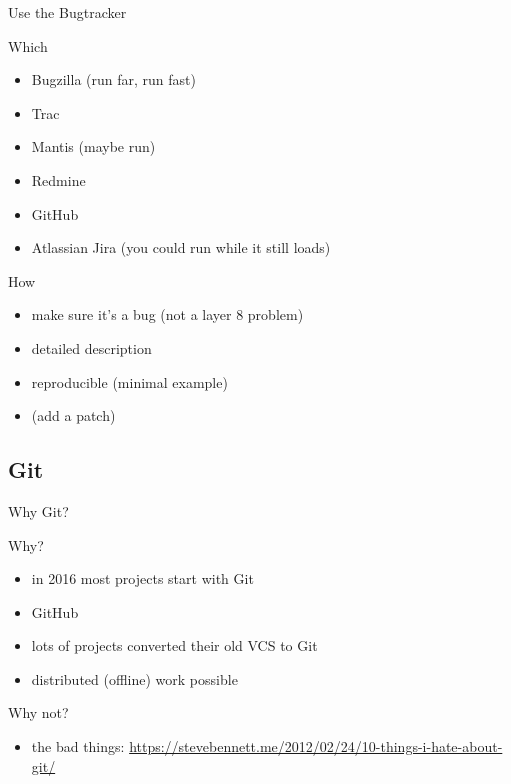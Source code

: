 \documentclass{beamer}
\begin{document}
\begin{frame}{Use the Bugtracker}
    \begin{block}{Which}
        \begin{itemize}
            \item Bugzilla (run far, run fast)
            \item Trac
            \item Mantis (maybe run)
            \item Redmine
            \item GitHub
            \item Atlassian Jira (you could run while it still loads)
        \end{itemize}
    \end{block}
    \pause
    \begin{block}{How}
        \begin{itemize}
            \item make sure it's a bug (not a layer 8 problem)
            \item detailed description
            \item reproducible (minimal example)
            \item (add a patch)
        \end{itemize}
    \end{block}
\end{frame}

\subsection{Git}

\begin{frame}{Why Git?}
    \begin{exampleblock}{Why?}
        \begin{itemize}
            \item in 2016 most projects start with Git
            \item GitHub
            \item lots of projects converted their old VCS to Git
            \item distributed (offline) work possible
        \end{itemize}
    \end{exampleblock}
    \pause
    \begin{alertblock}{Why not?}
        \begin{itemize}
            \item the bad things: \url{https://stevebennett.me/2012/02/24/10-things-i-hate-about-git/}
        \end{itemize}
    \end{alertblock}
\end{frame}
\end{document}
